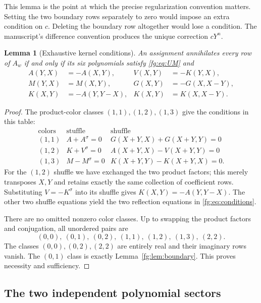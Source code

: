 \documentclass[11pt,a4paper]{article}
\newtheorem{lemma}[theorem]{Lemma}
\theoremstyle{definition}
\theoremstyle{remark}
\numberwithin{equation}{section}
\begin{document}
This lemma is the point at which the precise regularization convention
matters. Setting the two boundary rows separately to zero would impose
an extra condition on $c$. Deleting the boundary row altogether would
lose a condition. The manuscript's difference convention produces the
unique correction $cY^n$.

\begin{lemma}[Exhaustive kernel conditions]\label{fg:lem:conditions}
An assignment annihilates every row of $A_w$ if and only if its six
polynomials satisfy \eqref{fg:eq:UM} and
\begin{align}
 A(Y,X)&=-A(X,Y), & V(X,Y)&=-K(Y,X),\\
 M(Y,X)&=M(X,Y), & G(X,Y)&=-G(X,X-Y),\\
 K(X,Y)&=-A(Y,Y-X),&K(X,Y)&=K(X,X-Y).
 \label{fg:eq:conditions}
\end{align}
\end{lemma}
\begin{proof}
The product-color classes $(1,1),(1,2),(1,3)$ give the conditions in
this table:
\[
\begin{array}{c|c|c}
 \text{colors}&\text{stuffle}&\text{shuffle}\\ \hline
 (1,1)& A+A^\sigma=0
   &G(X+Y,X)+G(X+Y,Y)=0\\
 (1,2)&K+V^\sigma=0
   &A(X+Y,X)-V(X+Y,Y)=0\\
 (1,3)&M-M^\sigma=0
   &K(X+Y,Y)-K(X+Y,X)=0.
\end{array}
\]
For the $(1,2)$ shuffle we have exchanged the two product factors;
this merely transposes $X,Y$ and retains exactly the same collection
of coefficient rows. Substituting $V=-K^\sigma$ into its shuffle gives
$K(X,Y)=-A(Y,Y-X)$. The other two shuffle equations yield the two
reflection equations in \eqref{fg:eq:conditions}.

There are no omitted nonzero color classes. Up to swapping the product
factors and conjugation, all unordered pairs are
\[
 (0,0),\ (0,1),\ (0,2),\ (1,1),\ (1,2),\ (1,3),\ (2,2).
\]
The classes $(0,0),(0,2),(2,2)$ are entirely real and their imaginary
rows vanish. The $(0,1)$ class is exactly
Lemma~\ref{fg:lem:boundary}. This proves necessity and sufficiency.
\end{proof}

\subsection{The two independent polynomial sectors}
\end{document}
